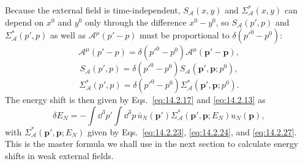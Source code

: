 Because the external field is time-independent, $S_{\mathcal A}(x,y)$ and
$\Sigma^*_{\mathcal A}(x,y)$ can depend on $x^0$ and $y^0$ only through the
difference $x^0-y^0$, so $S_{\mathcal A}(p',p)$ and
$\Sigma^*_{\mathcal A}(p',p)$ as well as $\mathcal A^\mu(p'-p)$ must be
proportional to $\delta(p'^0-p^0)$:
\begin{equation}
 \mathcal A^\mu(p'-p)=\delta(p'^0-p^0)\mathcal A^\mu(\mathbf p'-\mathbf p),
 \tag{14.2.25}\label{eq:14.2.25}
\end{equation}
\begin{equation}
 S_{\mathcal A}(p',p)=\delta(p'^0-p^0)S_{\mathcal A}(\mathbf p',\mathbf p;p^0),
 \tag{14.2.26}\label{eq:14.2.26}
\end{equation}
\begin{equation}
 \Sigma^*_{\mathcal A}(p',p)=\delta(p'^0-p^0)
 \Sigma^*_{\mathcal A}(\mathbf p',\mathbf p;p^0).
 \tag{14.2.27}\label{eq:14.2.27}
\end{equation}
The energy shift is then given by Eqs.~\eqref{eq:14.2.17} and
\eqref{eq:14.2.13} as
\begin{equation}
 \delta E_N=-\int \dd^3p'\int \dd^3p\,
 \bar u_N(\mathbf p')\Sigma^*_{\mathcal A}(\mathbf p',\mathbf p;E_N)u_N(\mathbf p),
 \tag{14.2.28}\label{eq:14.2.28}
\end{equation}
with $\Sigma^*_{\mathcal A}(\mathbf p',\mathbf p;E_N)$ given by
Eqs.~\eqref{eq:14.2.23}, \eqref{eq:14.2.24}, and \eqref{eq:14.2.27}. This is the
master formula we shall use in the next section to calculate energy shifts in
weak external fields.
